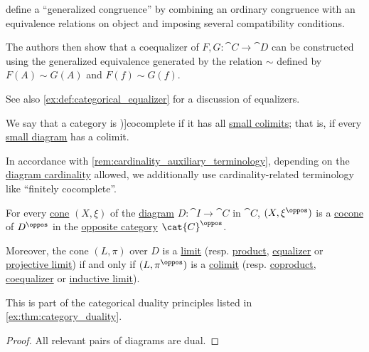 \begin{example}
\begin{thmenum}
    \Textcite[def. 3.6]{BednarczykEtAl1999GeneralizedCongruences} define a \enquote{generalized congruence} by combining an ordinary congruence with an equivalence relations on object and imposing several compatibility conditions.

    The authors then show that a coequalizer of \( F, G: \cat{C} \to \cat{D} \) can be constructed using the generalized equivalence generated by the relation \( {\sim} \) defined by \( F(A) \sim G(A) \) and \( F(f) \sim G(f) \).
  \end{thmenum}
\end{example}
\begin{comments}
  \item See also \cref{ex:def:categorical_equalizer} for a discussion of equalizers.
\end{comments}

\begin{definition}\label{def:cocomplete_category}
  We say that a category is \term[ru=кополная (категория) (\cite[157]{ЦаленкоШульгейфер1974ОсновыТеорииКатегорий})]{cocomplete} if it has all \hyperref[def:categorical_colimit/small]{small colimits}; that is, if every \hyperref[def:categorical_diagram/small]{small diagram} has a colimit.

  In accordance with \cref{rem:cardinality_auxiliary_terminology}, depending on the \hyperref[def:categorical_diagram/cardinality]{diagram cardinality} allowed, we additionally use cardinality-related terminology like \enquote{finitely cocomplete}.
\end{definition}

\begin{proposition}\label{thm:categorical_limit_duality}
  For every \hyperref[def:category_of_cones/objects]{cone} \( (X, \xi) \) of the \hyperref[def:categorical_diagram]{diagram} \( D: \cat{I} \to \cat{C} \) in \( \cat{C} \), \( (X, \xi^\oppos) \) is a \hyperref[def:category_of_cones/objects]{cocone} of \( D^\oppos \) in the \hyperref[def:opposite_category]{opposite category} \( \cat{C}^\oppos \).

  Moreover, the cone \( (L, \pi) \) over \( D \) is a \hyperref[def:categorical_limit]{limit} (resp. \hyperref[def:categorical_product]{product}, \hyperref[def:categorical_equalizer]{equalizer} or \hyperref[def:projective_limit]{projective limit}) if and only if \( (L, \pi^\oppos) \) is a \hyperref[def:categorical_colimit]{colimit} (resp. \hyperref[def:categorical_coproduct]{coproduct}, \hyperref[def:categorical_coequalizer]{coequalizer} or \hyperref[def:inductive_limit]{inductive limit}).
\end{proposition}
\begin{comments}
  \item This is part of the categorical duality principles listed in \cref{ex:thm:category_duality}.
\end{comments}
\begin{proof}
  All relevant pairs of diagrams are dual.
\end{proof}


